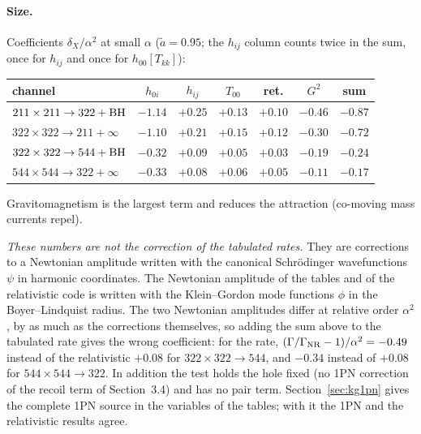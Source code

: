 \documentclass[11pt]{article}
\begin{document}
\paragraph{Size.} Coefficients $\delta_X/\alpha^2$ at small $\alpha$ ($\tilde a=0.95$; the $h_{ij}$ column counts twice in the sum, once for
$h_{ij}$ and once for $h_{00}[T_{kk}]$):
\begin{center}
\begin{tabular}{@{}lcccccc@{}}
\toprule
channel & $h_{0i}$ & $h_{ij}$ & $T_{00}$ & ret. & $G^2$ & sum\\
\midrule
$211\times211\to322+{\rm BH}$ & $-1.14$ & $+0.25$ & $+0.13$ & $+0.10$ & $-0.46$ & $-0.87$ \\
$322\times322\to211+\infty$ & $-1.10$ & $+0.21$ & $+0.15$ & $+0.12$ & $-0.30$ & $-0.72$ \\
$322\times322\to544+{\rm BH}$ & $-0.32$ & $+0.09$ & $+0.05$ & $+0.03$ & $-0.19$ & $-0.24$ \\
$544\times544\to322+\infty$ & $-0.33$ & $+0.08$ & $+0.06$ & $+0.05$ & $-0.11$ & $-0.17$ \\
\bottomrule
\end{tabular}
\end{center}
Gravitomagnetism is the largest term and reduces the attraction (co-moving mass currents repel).

\emph{These numbers are not the correction of the tabulated rates.} They are corrections to a Newtonian amplitude written with the
canonical Schr\"odinger wavefunctions $\psi$ in harmonic coordinates. The Newtonian amplitude of the tables and of the relativistic
code is written with the Klein--Gordon mode functions $\phi$ in the Boyer--Lindquist radius. The two Newtonian amplitudes differ at
relative order $\alpha^2$, by as much as the corrections themselves, so adding the sum above to the tabulated rate gives the wrong
coefficient: for the rate, $(\Gamma/\Gamma_{\rm NR}-1)/\alpha^2=-0.49$ instead of the relativistic $+0.08$ for $322\times322\to544$,
and $-0.34$ instead of $+0.08$ for $544\times544\to322$. In addition the test holds the hole fixed (no 1PN correction of the recoil
term of Section~3.4) and has no pair term. Section~\ref{sec:kg1pn} gives the complete 1PN source in the variables of the tables;
with it the 1PN and the relativistic results agree.
\end{document}
